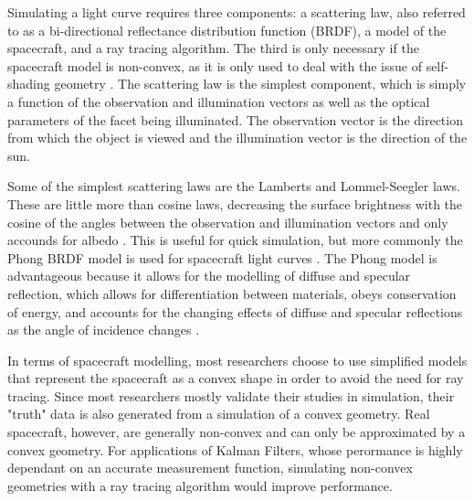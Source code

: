 \documentclass{article}
\begin{document}
Simulating a light curve requires three components: a scattering law, also referred to as a bi-directional reflectance distribution function (BRDF), a model of the spacecraft, and a ray tracing algorithm. The third is only necessary if the spacecraft model is non-convex, as it is only used to deal with the issue of self-shading geometry \cite{Kaasalainen}. The scattering law is the simplest component, which is simply a function of the observation and illumination vectors as well as the optical parameters of the facet being illuminated. The observation vector is the direction from which the object is viewed and the illumination vector is the direction of the sun.

Some of the simplest scattering laws are the Lamberts and Lommel-Seegler laws. These are little more than cosine laws, decreasing the surface brightness with the cosine of the angles between the observation and illumination vectors and only accounds for albedo \cite{Kaasalainen} \cite{Bradley2014LIGHTCURVEIF}. This is useful for quick simulation, but more commonly the Phong BRDF model is used for spacecraft light curves \cite{StateAndParameter} \cite{SpaceObjectCharacterization} \cite{LINARES20141}. The Phong model is advantageous because it allows for the modelling of diffuse and specular reflection, which allows for differentiation between materials, obeys conservation of energy, and accounts for the changing effects of diffuse and specular reflections as the angle of incidence changes \cite{Ashikhmin}.

In terms of spacecraft modelling, most researchers choose to use simplified models that represent the spacecraft as a convex shape in order to avoid the need for ray tracing. Since most researchers mostly validate their studies in simulation, their "truth" data is also generated from a simulation of a convex geometry. Real spacecraft, however, are generally non-convex and can only be approximated by a convex geometry. For applications of Kalman Filters, whose perormance is highly dependant on an accurate measurement function, simulating non-convex geometries with a ray tracing algorithm would improve performance.





\end{document}
